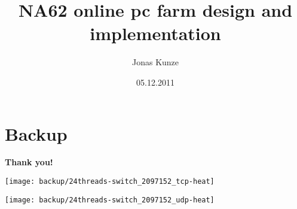 
\usepackage[ngerman]{babel}
\usepackage{bibgerm}


\title{NA62 online pc farm design and implementation}
\author{Jonas Kunze}
\date{05.12.2011}

\subject{NA62 online pc-farm design and implementation}


  	\frame{\titlepage}
  	\frame{\tableofcontents}
  	
  	
  	
  	
  	
  	
  	\section*{Backup}
	\begin{frame}{}
		\begin{center}
			\textbf{Thank you!}
		\end{center} 
	\end{frame}

	\begin{frame}{}
		\begin{center}
			\texttt{[image: backup/24threads-switch\_2097152\_tcp-heat]}
		\end{center}
	\end{frame}
	\begin{frame}{}
		\begin{center} 
			\texttt{[image: backup/24threads-switch\_2097152\_udp-heat]}
		\end{center} 
	\end{frame}
	
	
